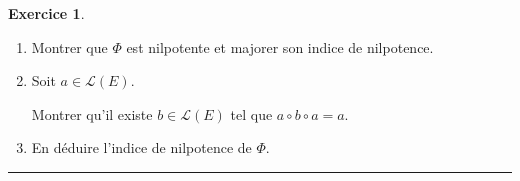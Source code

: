 \documentclass[a4paper,11pt]{article}
\theoremstyle{definition}
\newtheorem{exo}{Exercice} %
\begin{document}
\begin{minipage}{1\linewidth}
\begin{minipage}[t]{0.48\linewidth}
\begin{exo}
\begin{enumerate}
				\item Montrer que $\Phi$ est nilpotente et majorer son indice de nilpotence.
				\item Soit $a \in \mathscr{L}(E)$. 
				
				Montrer qu'il existe $b \in \mathscr{L}(E)$ tel que $a \circ b \circ a=a$.
				\item En déduire l'indice de nilpotence de $\Phi$.
	
			\end{enumerate}
			
			\centering\rule{1\linewidth}{0.6pt}\end{exo}
		
		
		
\end{minipage}\end{minipage} 
\end{document}
